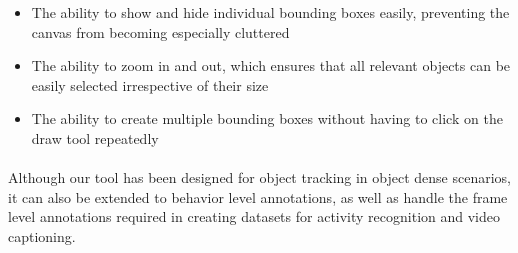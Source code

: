 \begin{itemize}
  \item The ability to show and hide individual bounding boxes easily, preventing the canvas from becoming especially cluttered
  \item The ability to zoom in and out, which ensures that all relevant objects can be easily selected irrespective of their size
  \item The ability to create multiple bounding boxes without having to click on the draw tool repeatedly
\end{itemize}
\paragraph{}Although our tool has been designed for object tracking in object dense scenarios, it can also be extended to behavior level annotations, as well as handle the frame level annotations required in creating datasets for activity recognition and video captioning.

 